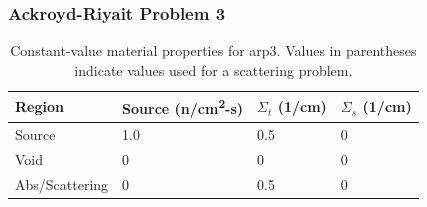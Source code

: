 \begin{frame}
  \frametitle{Ackroyd-Riyait Problem 3}
  
  \begin{table}
    \footnotesize
    \begin{tabular}{llll}
      \toprule
      Region         & Source (n/cm\textsuperscript{2}-s) & $\Sigma_t$ (1/cm) & $\Sigma_s$ (1/cm) \\
      \midrule
      Source         & 1.0                                & 0.5               & 0                 \\
      Void           & 0                                  & 0                 & 0                 \\
      Abs/Scattering & 0                                  & 0.5               & 0                 \\
      \bottomrule
    \end{tabular}
    \caption{\footnotesize Constant-value material properties for \gls{arp3}. Values in parentheses indicate values used for a scattering problem.}
    \label{tab:arp3-props}
  \end{table}
\end{frame}
